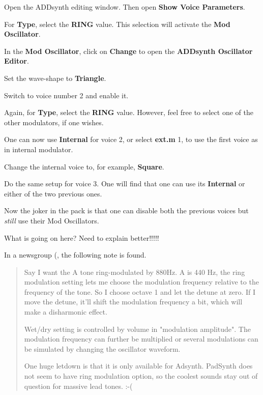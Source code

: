    \begin{enumber}
      \item Open the ADDsynth editing window.  Then open
         \textbf{Show Voice Parameters}.
      \item For \textbf{Type}, select the \textbf{RING} value.  This
      selection will activate the \textbf{Mod Oscillator}.
      \item In the \textbf{Mod Oscillator}, click on \textbf{Change} to open
      the \textbf{ADDsynth Oscillator Editor}.
      \item Set the wave-shape to \textbf{Triangle}.
      \item Switch to voice number 2 and enable it.
      \item Again, for \textbf{Type}, select the \textbf{RING} value.
      However, feel free to select one of the other modulators, if one
      wishes.
      \item One can now use \textbf{Internal} for voice 2, or select
      \textbf{ext.m} 1, to use the first voice as in internal modulator.
      \item Change the internal voice to, for example, \textbf{Square}.
      \item Do the same setup for voice 3.
      One will find that one can use its \textbf{Internal} or
      either of the two previous ones.
   \end{enumber}

   Now the joker in the pack is that one can disable both the previous
   voices but \textsl{still} use their Mod Oscillators.

   What is going on here?  Need to explain better!!!!!

   In a newsgroup (\cite{ringmodulator}, the following note is found.

   \begin{quotation}
      Say I want the A tone ring-modulated by 880Hz. A is 440 Hz, the ring
      modulation setting lets me choose the modulation frequency relative
      to the frequency of the tone. So I choose octave 1 and let the
      detune at zero. If I move the detune, it'll shift the modulation
      frequency a bit, which will make a disharmonic effect.

      Wet/dry setting is controlled by volume in "modulation amplitude".
      The modulation frequency can further be multiplied or several
      modulations can be simulated by changing the oscillator waveform.

      One huge letdown is that it is only available for Adsynth. PadSynth
      does not seem to have ring modulation option, so the coolest sounds
      stay out of question for massive lead tones. :-(
   \end{quotation}

